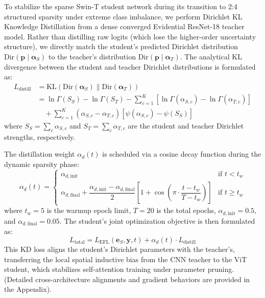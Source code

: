 \documentclass[letterpaper]{article} %
\newcommand{\Dir}{\text{Dir}}
\newcommand{\KL}{\text{KL}}
\begin{document}
To stabilize the sparse Swin-T student network during its transition to 2:4 structured sparsity under extreme class imbalance, we perform Dirichlet KL Knowledge Distillation from a dense converged Evidential ResNet-18 teacher model. Rather than distilling raw logits (which lose the higher-order uncertainty structure), we directly match the student's predicted Dirichlet distribution $\Dir(\bm{p} \mid \bm{\alpha}_S)$ to the teacher's distribution $\Dir(\bm{p} \mid \bm{\alpha}_T)$. The analytical KL divergence between the student and teacher Dirichlet distributions is formulated as:
\begin{align}
    L_{\text{distill}} &= \KL(\Dir(\bm{\alpha}_S) \| \Dir(\bm{\alpha}_T)) \nonumber \\
    &= \ln\Gamma(S_S) - \ln\Gamma(S_T) - \sum_{c=1}^K \left[\ln\Gamma(\alpha_{S,c}) - \ln\Gamma(\alpha_{T,c})\right] \nonumber \\
    &\quad + \sum_{c=1}^K (\alpha_{S,c} - \alpha_{T,c})\left[\psi(\alpha_{S,c}) - \psi(S_S)\right] \label{eq:dir_kl_full}
\end{align}
where $S_S = \sum_c \alpha_{S,c}$ and $S_T = \sum_c \alpha_{T,c}$ are the student and teacher Dirichlet strengths, respectively.

The distillation weight $\alpha_d(t)$ is scheduled via a cosine decay function during the dynamic sparsity phase:
\begin{equation}\label{eq:alpha_d}
    \alpha_d(t) = \begin{cases}
        \alpha_{d,\text{init}} & \text{if } t < t_w \\[6pt]
        \alpha_{d,\text{final}} + \dfrac{\alpha_{d,\text{init}} - \alpha_{d,\text{final}}}{2}\left[1 + \cos\!\left(\pi \cdot \dfrac{t - t_w}{T - t_w}\right)\right] & \text{if } t \ge t_w
    \end{cases}
\end{equation}
where $t_w = 5$ is the warmup epoch limit, $T = 20$ is the total epochs, $\alpha_{d,\text{init}} = 0.5$, and $\alpha_{d,\text{final}} = 0.05$. The student's joint optimization objective is then formulated as:
\begin{equation}\label{eq:total_loss}
    L_{\text{total}} = L_{\text{EFL}}(\bm{e}_S, \bm{y}, t) + \alpha_d(t) \cdot L_{\text{distill}}
\end{equation}
This KD loss aligns the student's Dirichlet parameters with the teacher's, transferring the local spatial inductive bias from the CNN teacher to the ViT student, which stabilizes self-attention training under parameter pruning. (Detailed cross-architecture alignments and gradient behaviors are provided in the Appendix).
\end{document}
